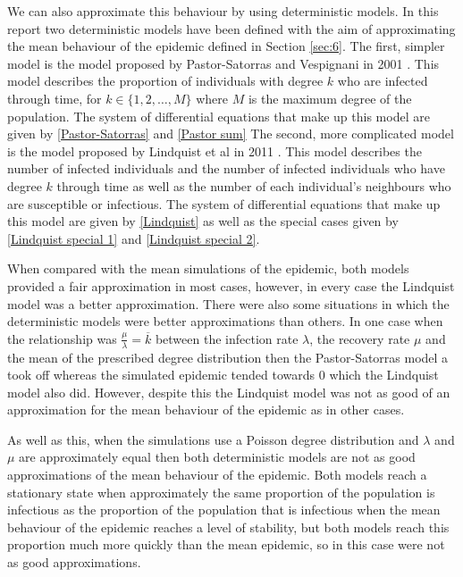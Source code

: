 \documentclass{uonmathsreport}
\begin{document}
We can also approximate this behaviour by using deterministic models. In this report two deterministic models have been defined with the aim of approximating the mean behaviour of the epidemic defined in Section \ref{sec:6}. The first, simpler model is the model proposed by Pastor-Satorras and Vespignani in 2001 \cite{bibpastor}. This model describes the proportion of individuals with degree $k$ who are infected through time, for $k \in \{1,2,…,M\}$ where $M$ is the maximum degree of the population. The system of differential equations that make up this model are given by \eqref{Pastor-Satorras} and \eqref{Pastor sum} The second, more complicated model is the model proposed by Lindquist et al in 2011 \cite{biblindquist}. This model describes the number of infected individuals and the number of infected individuals who have degree $k$ through time as well as the number of each individual’s neighbours who are susceptible or infectious. The system of differential equations that make up this model are given by \eqref{Lindquist} as well as the special cases given by \eqref{Lindquist special 1} and \eqref{Lindquist special 2}.

When compared with the mean simulations of the epidemic, both models provided a fair approximation in most cases, however, in every case the Lindquist model was a better approximation. There were also some situations in which the deterministic models were better approximations than others. In one case when the relationship was $\frac{\mu}{\lambda}=\overline{k}$ between the infection rate $\lambda$, the recovery rate $\mu$ and the mean of the prescribed degree distribution then the Pastor-Satorras model a took off whereas the simulated epidemic tended towards $0$ which the Lindquist model also did. However, despite this the Lindquist model was not as good of an approximation for the mean behaviour of the epidemic as in other cases.

As well as this, when the simulations use a Poisson degree distribution and $\lambda$ and $\mu$ are approximately equal then both deterministic models are not as good approximations of the mean behaviour of the epidemic. Both models reach a stationary state when approximately the same proportion of the population is infectious as the proportion of the population that is infectious when the mean behaviour of the epidemic reaches a level of stability, but both models reach this proportion much more quickly than the mean epidemic, so in this case were not as good approximations.
\end{document}
